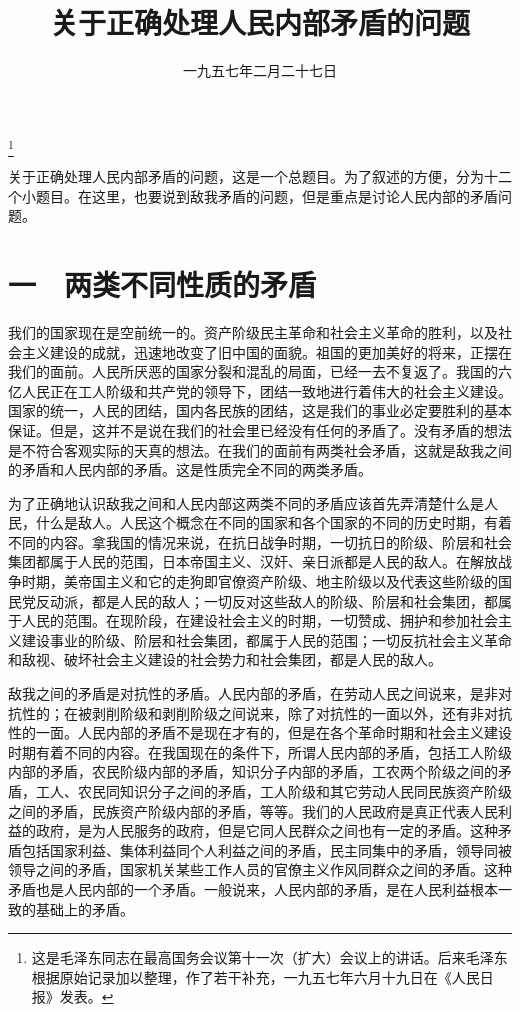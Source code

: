 
\title{关于正确处理人民内部矛盾的问题}
\date{一九五七年二月二十七日}
\thanks{这是毛泽东同志在最高国务会议第十一次（扩大）会议上的讲话。后来毛泽东根据原始记录加以整理，作了若干补充，一九五七年六月十九日在《人民日报》发表。}
\maketitle


关于正确处理人民内部矛盾的问题，这是一个总题目。为了叙述的方便，分为十二个小题目。在这里，也要说到敌我矛盾的问题，但是重点是讨论人民内部的矛盾问题。

\section{一　两类不同性质的矛盾}

我们的国家现在是空前统一的。资产阶级民主革命和社会主义革命的胜利，以及社会主义建设的成就，迅速地改变了旧中国的面貌。祖国的更加美好的将来，正摆在我们的面前。人民所厌恶的国家分裂和混乱的局面，已经一去不复返了。我国的六亿人民正在工人阶级和共产党的领导下，团结一致地进行着伟大的社会主义建设。国家的统一，人民的团结，国内各民族的团结，这是我们的事业必定要胜利的基本保证。但是，这并不是说在我们的社会里已经没有任何的矛盾了。没有矛盾的想法是不符合客观实际的天真的想法。在我们的面前有两类社会矛盾，这就是敌我之间的矛盾和人民内部的矛盾。这是性质完全不同的两类矛盾。

为了正确地认识敌我之间和人民内部这两类不同的矛盾应该首先弄清楚什么是人民，什么是敌人。人民这个概念在不同的国家和各个国家的不同的历史时期，有着不同的内容。拿我国的情况来说，在抗日战争时期，一切抗日的阶级、阶层和社会集团都属于人民的范围，日本帝国主义、汉奸、亲日派都是人民的敌人。在解放战争时期，美帝国主义和它的走狗即官僚资产阶级、地主阶级以及代表这些阶级的国民党反动派，都是人民的敌人；一切反对这些敌人的阶级、阶层和社会集团，都属于人民的范围。在现阶段，在建设社会主义的时期，一切赞成、拥护和参加社会主义建设事业的阶级、阶层和社会集团，都属于人民的范围；一切反抗社会主义革命和敌视、破坏社会主义建设的社会势力和社会集团，都是人民的敌人。

敌我之间的矛盾是对抗性的矛盾。人民内部的矛盾，在劳动人民之间说来，是非对抗性的；在被剥削阶级和剥削阶级之间说来，除了对抗性的一面以外，还有非对抗性的一面。人民内部的矛盾不是现在才有的，但是在各个革命时期和社会主义建设时期有着不同的内容。在我国现在的条件下，所谓人民内部的矛盾，包括工人阶级内部的矛盾，农民阶级内部的矛盾，知识分子内部的矛盾，工农两个阶级之间的矛盾，工人、农民同知识分子之间的矛盾，工人阶级和其它劳动人民同民族资产阶级之间的矛盾，民族资产阶级内部的矛盾，等等。我们的人民政府是真正代表人民利益的政府，是为人民服务的政府，但是它同人民群众之间也有一定的矛盾。这种矛盾包括国家利益、集体利益同个人利益之间的矛盾，民主同集中的矛盾，领导同被领导之间的矛盾，国家机关某些工作人员的官僚主义作风同群众之间的矛盾。这种矛盾也是人民内部的一个矛盾。一般说来，人民内部的矛盾，是在人民利益根本一致的基础上的矛盾。

